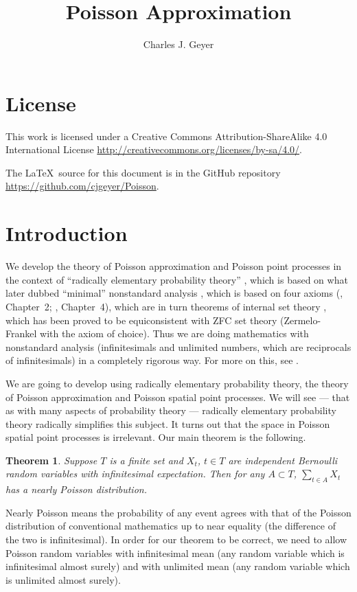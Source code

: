 \documentclass[11pt]{article}
\newtheorem{theorem}{Theorem}
\begin{document}
\title{Poisson Approximation}

\author{Charles J. Geyer}

\maketitle

\section{License}

This work is licensed under a Creative Commons
Attribution-ShareAlike 4.0 International License
\url{http://creativecommons.org/licenses/by-sa/4.0/}.

The \LaTeX\ source for this document is in the GitHub
repository \url{https://github.com/cjgeyer/Poisson}.

\section{Introduction}

We develop the theory of Poisson approximation and Poisson point processes
in the context of ``radically elementary probability theory'' \citep{nelson},
which is based on what \citeauthor{nelson} later dubbed ``minimal'' nonstandard
analysis \citep{nelson-minimal}, which is based on four axioms
(\citealp{geyer}, Chapter~2; \citet{nelson}, Chapter~4), which are in turn
theorems of internal set theory \citep{nelson-bull}, which has been proved
to be equiconsistent with ZFC set theory (Zermelo-Frankel with the axiom of
choice).  Thus we are doing mathematics with nonstandard analysis
(infinitesimals and unlimited numbers, which are reciprocals of infinitesimals)
in a completely rigorous way.  For more on this, see \citet[Chapter~2]{geyer}.

We are going to develop using radically elementary probability theory,
the theory of Poisson approximation and Poisson spatial point processes.
We will see --- that as with many aspects of probability theory --- radically
elementary probability theory radically simplifies this subject.  It turns
out that the space in Poisson spatial point processes is irrelevant.
Our main theorem is the following.
\begin{theorem} \label{th:main}
Suppose $T$ is a finite set and $X_t$, $t \in T$ are independent Bernoulli
random variables with infinitesimal expectation.  Then for any $A \subset T$,
$\sum_{t \in A} X_t$ has a nearly Poisson distribution.
\end{theorem}
Nearly Poisson means the probability of any event agrees with that of the
Poisson distribution of conventional mathematics up to near equality
(the difference of the two is infinitesimal).  In order for our theorem
to be correct, we need to allow Poisson random variables with infinitesimal
mean (any random variable which is infinitesimal almost surely) and with
unlimited mean (any random variable which is unlimited almost surely).
\end{document}
